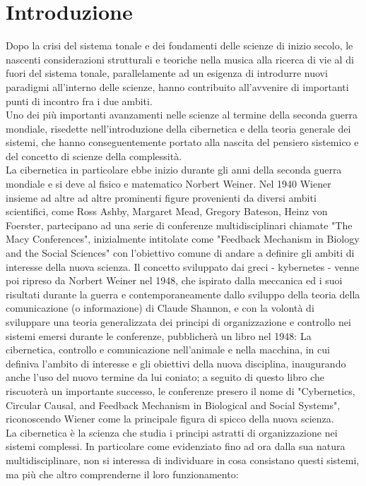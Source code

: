 \section{Introduzione}
\label{sec:Introduzione}


Dopo la crisi del sistema tonale e dei fondamenti delle scienze di inizio secolo,
le nascenti considerazioni strutturali e teoriche
nella musica alla ricerca di vie al di fuori del sistema tonale,
parallelamente ad un esigenza di introdurre nuovi paradigmi all'interno delle scienze,
hanno contribuito all'avvenire di importanti punti di incontro fra i due ambiti.
\\
Uno dei più importanti avanzamenti nelle scienze
al termine della seconda guerra mondiale, risedette nell'introduzione della
cibernetica e della teoria generale dei sistemi, che hanno conseguentemente
portato alla nascita del pensiero sistemico e del concetto
di scienze della complessità.
\\
La cibernetica in particolare ebbe inizio durante gli anni della seconda guerra
mondiale e si deve al fisico e matematico Norbert Weiner.
Nel 1940 Wiener insieme ad altre ad altre prominenti figure provenienti
da diversi ambiti scientifici,
come Ross Ashby, Margaret Mead, Gregory Bateson, Heinz von Foerster,
partecipano ad una serie di conferenze
multidisciplinari chiamate "The Macy Conferences", inizialmente intitolate come
"Feedback Mechanism in Biology and the Social Sciences"
con l'obiettivo comune di andare a definire
gli ambiti di interesse della nuova scienza.
Il concetto sviluppato dai greci - kybernetes -
venne poi ripreso da Norbert Weiner nel 1948,
che ispirato dalla meccanica ed i suoi risultati durante la guerra
e contemporaneamente dallo sviluppo della teoria della comunicazione
(o informazione) di Claude Shannon,
e con la volontà di sviluppare una teoria generalizzata dei principi di
organizzazione e controllo nei sistemi emersi durante le conferenze,
pubblicherà un libro nel 1948:
La cibernetica, controllo e comunicazione nell'animale e nella macchina,
in cui definiva l'ambito di interesse e gli obiettivi della nuova disciplina,
inaugurando anche l'uso del nuovo termine da lui coniato;
a seguito di questo libro che riscuoterà
un importante successo, le conferenze presero il nome di
"Cybernetics, Circular Causal, and Feedback Mechanism in Biological and Social Systems",
riconoscendo Wiener come la principale figura di spicco della nuova scienza.
\\
La cibernetica è la scienza che studia i principi astratti di organizzazione
nei sistemi complessi.
In particolare come evidenziato fino ad ora dalla sua natura multidisciplinare,
non si interessa di individuare in cosa consistano questi sistemi,
ma più che altro comprenderne il loro funzionamento:

